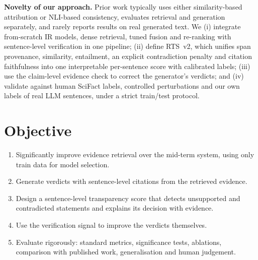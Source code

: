 \documentclass[conference]{IEEEtran}
\begin{document}
\textbf{Novelty of our approach.} Prior work typically uses either similarity-based attribution or NLI-based consistency,
evaluates retrieval and generation separately, and rarely reports results on real generated text. We (i) integrate
from-scratch IR models, dense retrieval, tuned fusion and re-ranking with sentence-level verification in one pipeline;
(ii) define RTS~v2, which unifies span provenance, similarity, entailment, an explicit contradiction penalty and citation
faithfulness into one interpretable per-sentence score with calibrated labels; (iii) use the claim-level evidence check to
correct the generator's verdicts; and (iv) validate against human SciFact labels, controlled perturbations and our own
labels of real LLM sentences, under a strict train/test protocol.

\section{Objective}
\begin{enumerate}
\item[O1] Significantly improve evidence retrieval over the mid-term system, using only train data for model selection.
\item[O2] Generate verdicts with sentence-level citations from the retrieved evidence.
\item[O3] Design a sentence-level transparency score that detects unsupported and contradicted statements and explains
its decision with evidence.
\item[O4] Use the verification signal to improve the verdicts themselves.
\item[O5] Evaluate rigorously: standard metrics, significance tests, ablations, comparison with published work,
generalisation and human judgement.
\end{enumerate}

\end{document}
